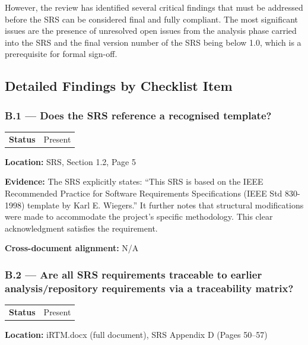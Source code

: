 \documentclass[11pt,a4paper]{article}
\begin{document}
However, the review has identified several critical findings that must be addressed before the SRS can be considered final and fully compliant. The most significant issues are the presence of unresolved open issues from the analysis phase carried into the SRS and the final version number of the SRS being below 1.0, which is a prerequisite for formal sign-off.

\subsection{Detailed Findings by Checklist Item}

\subsubsection*{B.1 --- Does the SRS reference a recognised template?}

\begin{tabular}{p{}p{}}
\textbf{Status} & Present \\
\end{tabular}

\textbf{Location:} SRS, Section 1.2, Page 5

\textbf{Evidence:} The SRS explicitly states: ``This SRS is based on the IEEE Recommended Practice for Software Requirements Specifications (IEEE Std 830-1998) template by Karl E. Wiegers.'' It further notes that structural modifications were made to accommodate the project's specific methodology. This clear acknowledgment satisfies the requirement.

\textbf{Cross-document alignment:} N/A

\vspace{0.8em}

\subsubsection*{B.2 --- Are all SRS requirements traceable to earlier analysis/repository requirements via a traceability matrix?}

\begin{tabular}{p{}p{}}
\textbf{Status} & Present \\
\end{tabular}

\textbf{Location:} iRTM.docx (full document), SRS Appendix D (Pages 50--57)
\end{document}
